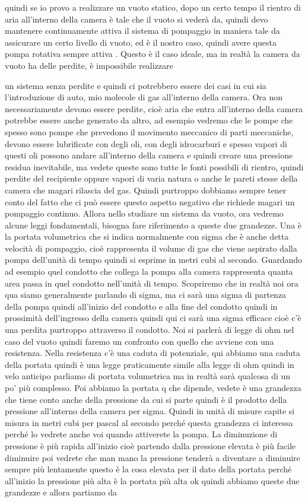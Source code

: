 quindi se io provo a realizzare un vuoto statico, dopo un certo tempo il rientro di aria all'interno della camera è tale che il vuoto si vederà da, quindi devo mantenere continuamente attiva il sistema di pompaggio in maniera tale da assicurare un certo livello di vuoto, ed è il nostro caso, quindi avere questa pompa rotativa sempre attiva . Questo è il caso ideale, ma in realtà la camera da vuoto ha delle perdite, è impossibile realizzare

un sistema senza perdite e quindi ci potrebbero essere dei casi in cui sia l'introduzione di auto, mio molecole di gas all'interno della camera. Ora non necessariamente devono essere perdite, cioè aria che entra all'interno della camera potrebbe essere anche generato da altro, ad esempio vedremo che le pompe che spesso sono pompe che prevedono il movimento meccanico di parti meccaniche, devono essere lubrificate con degli oli, con degli idrocarburi e spesso vapori di questi oli possono andare all'interno della camera e quindi creare una pressione residua inevitabile, ma vedete queste sono tutte le fonti possibili di rientro, quindi perdite del recipiente oppure vapori di varia natura o anche le pareti stesse della camera che magari rilascia del gas. Quindi purtroppo dobbiamo sempre tener conto del fatto che ci può essere questo aspetto negativo che richiede magari un pompaggio continuo. Allora nello studiare un sistema da vuoto, ora vedremo alcune leggi fondamentali, bisogna fare riferimento a queste due grandezze. Una è la portata volumetrica che si indica normalmente con sigma che è anche detta velocità di pompaggio, cioè rappresenta il volume di gas che viene aspirato dalla pompa dell'unità di tempo quindi si esprime in metri cubi al secondo. Guardando ad esempio quel condotto che collega la pompa alla camera rappresenta quanta area passa in quel condotto nell'unità di tempo. Scopriremo che in realtà noi ora qua siamo generalmente parlando di sigma, ma ci sarà una sigma di partenza della pompa quindi all'inizio del condotto e alla fine del condotto quindi in prossimità dell'ingresso della camera quindi qui ci sarà una sigma efficace cioè c'è una perdita purtroppo attraverso il condotto. Noi si parlerà di legge di ohm nel caso del vuoto quindi faremo un confronto con quello che avviene con una resistenza. Nella resistenza c'è una caduta di potenziale, qui abbiamo una caduta della portata quindi è una legge praticamente simile alla legge di ohm quindi in velo anticipo parliamo di portata volumetrica ma in realtà sarà qualcosa di un po' più complesso. Poi abbiamo la portata q che dipende, vedete è una grandezza che tiene conto anche della pressione da cui si parte quindi è il prodotto della pressione all'interno della camera per sigma. Quindi in unità di misure capite si misura in metri cubi per pascal al secondo perché questa grandezza ci interessa perché lo vedrete anche voi quando attiverete la pompa. La diminuzione di pressione è più rapida all'inizio cioè partendo dalla pressione elevata è più facile diminuire poi vedrete che man mano la pressione tenderà a diventare a diminuire sempre più lentamente questo è la cosa elevata per il dato della portata perché all'inizio la pressione più alta è la portata più alta ok quindi abbiamo queste due grandezze e allora partiamo da 